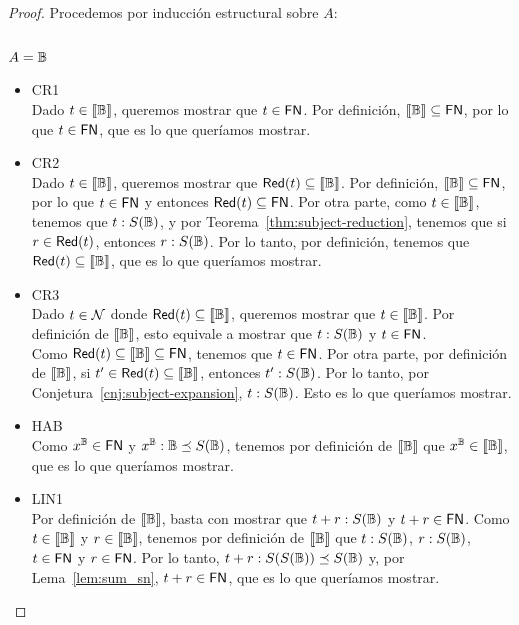 \begin{proof}
  Procedemos por inducción estructural sobre \( A \):
  \subsection*{\( A = \mathbb{B} \)}
  \begin{itemize}
    \item CR1
      \\ Dado \( t \in \llbracket\mathbb{B}\rrbracket \), queremos mostrar que \( t \in \mathsf{FN} \). Por definición, \( \llbracket\mathbb{B}\rrbracket \subseteq \mathsf{FN} \), por lo que \( t \in \mathsf{FN} \), que es lo que queríamos mostrar.
    \item CR2
      \\ Dado \( t \in \llbracket\mathbb{B}\rrbracket \), queremos mostrar que \( \mathsf{Red} (t) \subseteq \llbracket\mathbb{B}\rrbracket \). Por definición, \( \llbracket\mathbb{B}\rrbracket \subseteq \mathsf{FN} \), por lo que \( t \in \mathsf{FN} \) y entonces \( \mathsf{Red} (t) \subseteq \mathsf{FN} \). Por otra parte, como \( t \in \llbracket\mathbb{B}\rrbracket \), tenemos que \( t : S(\mathbb{B}) \), y por Teorema~\ref{thm:subject-reduction}, tenemos que si \( r \in \mathsf{Red} (t) \), entonces \( r : S(\mathbb{B}) \). Por lo tanto, por definición, tenemos que \( \mathsf{Red} (t) \subseteq \llbracket\mathbb{B}\rrbracket \), que es lo que queríamos mostrar.
    \item CR3
      \\ Dado \( t \in \mathcal{N} \) donde \( \mathsf{Red} (t) \subseteq \llbracket\mathbb{B}\rrbracket \), queremos mostrar que \( t \in \llbracket\mathbb{B}\rrbracket \). Por definición de \( \llbracket\mathbb{B}\rrbracket \), esto equivale a mostrar que \( t : S(\mathbb{B}) \) y \( t \in \mathsf{FN} \).
      \\ Como \( \mathsf{Red} (t) \subseteq \llbracket\mathbb{B}\rrbracket \subseteq \mathsf{FN} \), tenemos que \( t \in \mathsf{FN} \). Por otra parte, por definición de \( \llbracket\mathbb{B}\rrbracket \), si \( t' \in \mathsf{Red} (t) \subseteq \llbracket\mathbb{B}\rrbracket \), entonces \( t' : S(\mathbb{B}) \). Por lo tanto, por Conjetura~\ref{cnj:subject-expansion}, \( t : S(\mathbb{B}) \). Esto es lo que queríamos mostrar.
    \item HAB
      \\ Como \( x^{\mathbb{B}} \in \mathsf{FN} \) y \( x^{\mathbb{B}} : \mathbb{B} \preceq S(\mathbb{B}) \), tenemos por definición de \( \llbracket\mathbb{B}\rrbracket \) que \( x^{\mathbb{B}} \in \llbracket\mathbb{B}\rrbracket \), que es lo que queríamos mostrar.
    \item LIN1
      \\ Por definición de \( \llbracket\mathbb{B}\rrbracket \), basta con mostrar que \( t + r : S(\mathbb{B}) \) y \( t + r \in \mathsf{FN} \). Como \( t \in \llbracket\mathbb{B}\rrbracket \) y \( r \in \llbracket\mathbb{B}\rrbracket \), tenemos por definición de \( \llbracket\mathbb{B}\rrbracket \) que \( t : S(\mathbb{B}) \), \( r : S(\mathbb{B}) \), \( t \in \mathsf{FN} \) y \( r \in \mathsf{FN} \). Por lo tanto, \( t + r : S(S(\mathbb{B})) \preceq S(\mathbb{B}) \) y, por Lema~\ref{lem:sum_sn}, \( t + r \in \mathsf{FN} \), que es lo que queríamos mostrar.

\end{itemize}
\end{proof}
